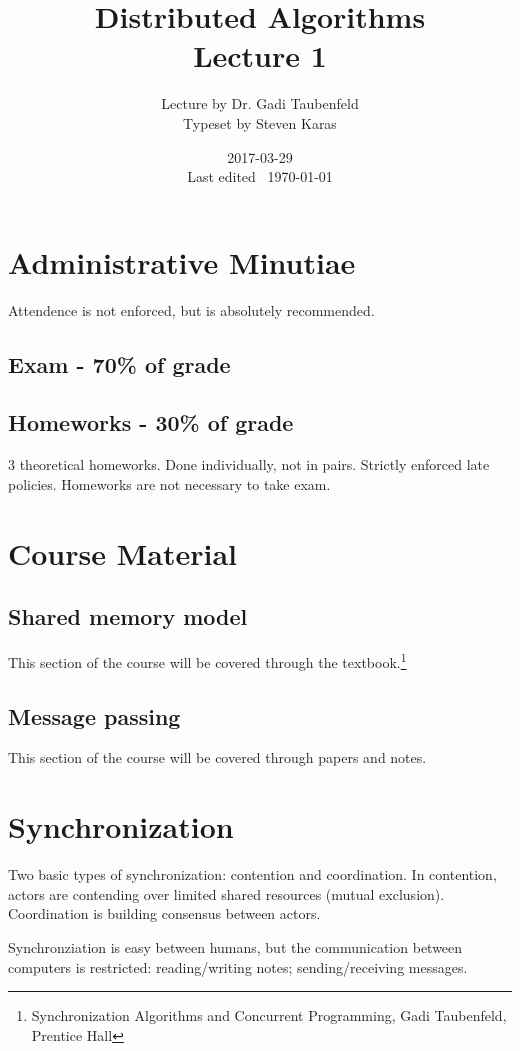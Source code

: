 \documentclass[a4paper]{article}
\title{Distributed Algorithms\\\large Lecture 1}
\date{2017-03-29 \\ Last edited \currenttime\ \today}
\author{Lecture by Dr. Gadi Taubenfeld\\Typeset by Steven Karas}
\begin{document}
\maketitle

\section{Administrative Minutiae}

Attendence is not enforced, but is absolutely recommended.

\subsection{Exam - 70\% of grade}

\subsection{Homeworks - 30\% of grade}
3 theoretical homeworks.
Done individually, not in pairs.
Strictly enforced late policies.
Homeworks are not necessary to take exam.

\section{Course Material}

\subsection{Shared memory model}
This section of the course will be covered through the textbook.\footnote{Synchronization Algorithms and Concurrent Programming, Gadi Taubenfeld, Prentice Hall}

\subsection{Message passing}
This section of the course will be covered through papers and notes.


\clearpage
\section{Synchronization}

Two basic types of synchronization: contention and coordination.
In contention, actors are contending over limited shared resources (mutual exclusion).
Coordination is building consensus between actors.

Synchronziation is easy between humans, but the communication between computers is restricted: reading/writing notes; sending/receiving messages.
\end{document}
